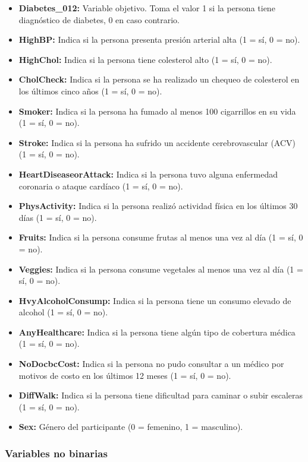 \documentclass[a4paper,10pt]{book}
\begin{document}
\begin{itemize}
	\item \textbf{Diabetes\_012:} Variable objetivo. Toma el valor 1 si la persona tiene diagnóstico de diabetes, 0 en caso contrario.
	\item \textbf{HighBP:} Indica si la persona presenta presión arterial alta (1 = sí, 0 = no).
	\item \textbf{HighChol:} Indica si la persona tiene colesterol alto (1 = sí, 0 = no).
	\item \textbf{CholCheck:} Indica si la persona se ha realizado un chequeo de colesterol en los últimos cinco años (1 = sí, 0 = no).
	\item \textbf{Smoker:} Indica si la persona ha fumado al menos 100 cigarrillos en su vida (1 = sí, 0 = no).
	\item \textbf{Stroke:} Indica si la persona ha sufrido un accidente cerebrovascular (ACV) (1 = sí, 0 = no).
	\item \textbf{HeartDiseaseorAttack:} Indica si la persona tuvo alguna enfermedad coronaria o ataque cardíaco (1 = sí, 0 = no).
	\item \textbf{PhysActivity:} Indica si la persona realizó actividad física en los últimos 30 días (1 = sí, 0 = no).
	\item \textbf{Fruits:} Indica si la persona consume frutas al menos una vez al día (1 = sí, 0 = no).
	\item \textbf{Veggies:} Indica si la persona consume vegetales al menos una vez al día (1 = sí, 0 = no).
	\item \textbf{HvyAlcoholConsump:} Indica si la persona tiene un consumo elevado de alcohol (1 = sí, 0 = no).
	\item \textbf{AnyHealthcare:} Indica si la persona tiene algún tipo de cobertura médica (1 = sí, 0 = no).
	\item \textbf{NoDocbcCost:} Indica si la persona no pudo consultar a un médico por motivos de costo en los últimos 12 meses (1 = sí, 0 = no).
	\item \textbf{DiffWalk:} Indica si la persona tiene dificultad para caminar o subir escaleras (1 = sí, 0 = no).
	\item \textbf{Sex:} Género del participante (0 = femenino, 1 = masculino).
\end{itemize}

\subsubsection*{Variables no binarias}
\end{document}
